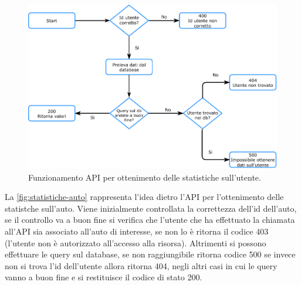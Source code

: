 \documentclass[italian, Lau, oneside, nodefaultfont, noexaminfo]{sapthesis}
\begin{document}
\begin{center}
\begin{figure}[H]
    \includegraphics[width=\textwidth]{figure/user-statistics-flow-chart.pdf}
    \caption{Funzionamento API per ottenimento delle statistiche sull'utente.}
    \label{fig:statistiche-utente}
\end{figure}
\end{center}


La \autoref{fig:statistiche-auto} rappresenta l'idea dietro l'API  per l'ottenimento delle statistche sull'auto. Viene inizialmente controllata la correttezza dell'id dell'auto, se il controllo va a buon fine si verifica che l'utente che ha effettuato la chiamata all'API sia associato all'auto di interesse, se non lo è ritorna il codice 403 (l'utente non è autorizzato all'accesso alla risorsa). Altrimenti si possono effettuare le query sul database, se non raggiungibile ritorna codice 500 se invece non si trova l'id dell'utente allora ritorna 404, negli altri casi in cui le query vanno a buon fine e si restituisce il codice di stato 200.
\end{document}
